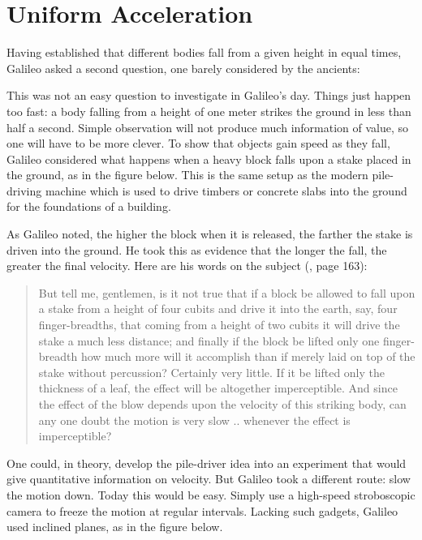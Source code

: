 \section{Uniform Acceleration}


Having established that different
bodies fall from a given height in
equal times, Galileo asked a second
question, one barely considered by
the ancients:

\begin{indent}
\end{indent}

This was not an easy question to
investigate in Galileo's day. Things
just happen too fast: a body falling
from a height of one meter strikes
the ground in less than half a second.
Simple observation will not produce
much information of value, so one will
have to be more clever. To show that
objects gain speed as they fall, Galileo
considered what happens when a heavy
block falls upon a stake placed in
the ground, as in the figure below.
This is the same setup as the modern
pile-driving machine which is used to
drive timbers or concrete slabs into
the ground for the foundations of a
building.


As Galileo noted, the higher the block
when it is released, the farther the
stake is driven into the ground. He took
this as evidence that the longer the
fall, the greater the final velocity.
Here are his words on the subject
(, page 163):

\begin{quotation}
But tell me, gentlemen, is it not
true that if a block be allowed to
fall upon a stake from a height of four
cubits and drive it into the earth,
say, four finger-breadths, that coming
from a height of two cubits it will
drive the stake a much less distance;
and finally if the block be lifted
only one finger-breadth how much more
will it accomplish than if merely laid
on top of the stake without percussion?
Certainly very little. If it be lifted
only the thickness of a leaf, the effect
will be altogether imperceptible. And
since the effect of the blow depends
upon the velocity of this striking
body, can any one doubt the motion is
very slow .. whenever the effect is
imperceptible?
\end{quotation}

One could, in theory, develop the
pile-driver idea into an experiment
that would give quantitative information
on velocity. But Galileo took a different
route: slow the motion down. Today this
would be easy. Simply use a high-speed
stroboscopic camera to freeze the
motion at regular intervals. Lacking
such gadgets, Galileo used inclined
planes, as in the figure below.


